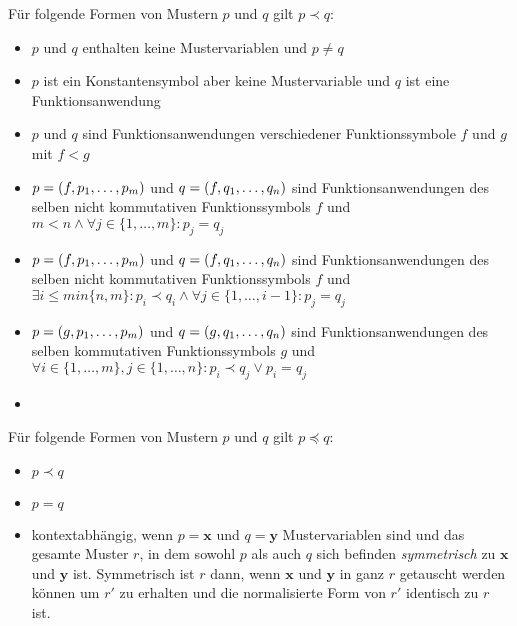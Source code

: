 Für folgende Formen von Mustern $p$ und $q$ gilt $p \prec q$:
\begin{itemize}
    \item{$p$ und $q$ enthalten keine Mustervariablen und $p \neq q$}
    
    \item{$p$ ist ein Konstantensymbol aber keine Mustervariable und $q$ ist eine Funktionsanwendung}
    
    \item{$p$ und $q$ sind Funktionsanwendungen verschiedener Funktionssymbole $f$ und $g$ mit $f < g$}
    
    \item{$p = (f, {p}_{1}, \dots, {p}_{m})$ und $q = (f, {q}_{1}, \dots, {q}_{n})$ sind Funktionsanwendungen des selben nicht kommutativen Funktionssymbols $f$ und $m < n \land \forall j \in \{1, \dots, m\} \colon p_j = q_j$}
    
    \item{$p = (f, {p}_{1}, \dots, {p}_{m})$ und $q = (f, {q}_{1}, \dots, {q}_{n})$ sind Funktionsanwendungen des selben nicht kommutativen Funktionssymbols $f$ und $\exists i \leq min\{n, m\} \colon p_i \prec q_i \land \forall j \in \{1, \dots, i  - 1\} \colon p_j = q_j$}
    
    \item{$p = (g, {p}_{1}, \dots, {p}_{m})$ und $q = (g, {q}_{1}, \dots, {q}_{n})$ sind Funktionsanwendungen des selben kommutativen Funktionssymbols $g$ und $\forall i \in \{1, \dots, m\}, j \in \{1, \dots, n\} \colon p_i \prec q_j \lor p_i = q_j$}
    
    \item{}
\end{itemize}



Für folgende Formen von Mustern $p$ und $q$ gilt $p \preceq q$:
\begin{itemize}
    \item{$p \prec q$}
    
    \item{$p = q$}
    
    \item{kontextabhängig, wenn $p = \mathbf x$ und $q = \mathbf y$ Mustervariablen sind und das gesamte Muster $r$, in dem sowohl $p$ als auch $q$ sich befinden \emph{symmetrisch} zu $\mathbf x$ und $\mathbf y$ ist. Symmetrisch ist $r$ dann, wenn $\mathbf x$ und $\mathbf y$ in ganz $r$ getauscht werden können um $r'$ zu erhalten und die normalisierte Form von $r'$ identisch zu $r$ ist.}
\end{itemize}

